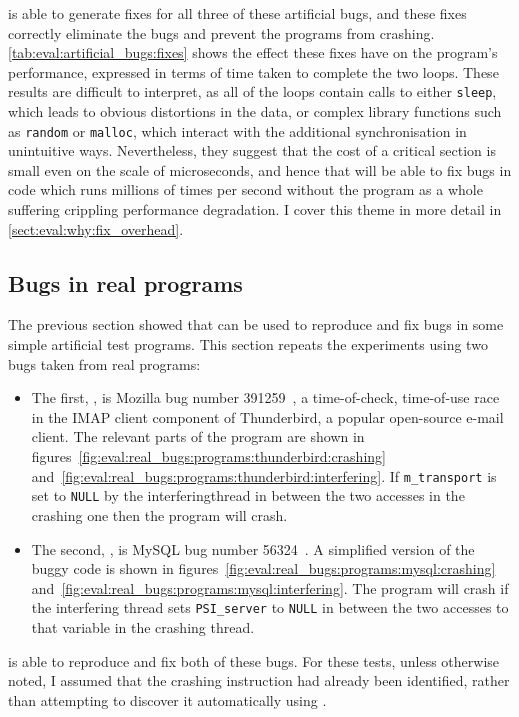 \noindent
{\Technique} is able to generate fixes for all three of these
artificial bugs, and these fixes correctly eliminate the bugs and
prevent the programs from crashing.
\autoref{tab:eval:artificial_bugs:fixes} shows the effect these fixes
have on the program's performance, expressed in terms of time taken to
complete the two loops.  These results are difficult to interpret, as
all of the loops contain calls to either \texttt{sleep}, which leads
to obvious distortions in the data, or complex library functions such
as \texttt{random} or \texttt{malloc}, which interact with the
additional synchronisation in unintuitive ways.  Nevertheless, they
suggest that the cost of a {\technique} critical section is small even
on the scale of microseconds, and hence that {\technique} will be able
to fix bugs in code which runs millions of times per second without
the program as a whole suffering crippling performance degradation.  I
cover this theme in more detail in
\autoref{sect:eval:why:fix_overhead}.

\subsection{Bugs in real programs}
\label{sect:eval:does:real}

The previous section showed that {\technique} can be used to reproduce
and fix bugs in some simple artificial test programs.  This section
repeats the experiments using two bugs taken from real programs:
\begin{itemize}
\item The first, , is Mozilla bug number
  391259~\cite{Mery2007}, a time-of-check, time-of-use race in the IMAP
  client component of Thunderbird, a popular open-source e-mail
  client.  The relevant parts of the program are shown in
  figures~\ref{fig:eval:real_bugs:programs:thunderbird:crashing}
  and~\ref{fig:eval:real_bugs:programs:thunderbird:interfering}.  If
  \verb|m_transport| is set to \verb|NULL| by the
  \gls{interferingthread} in between the two accesses in the crashing
  one then the program will crash.
\item The second, , is MySQL bug number
  56324~\cite{Correia2010}.  A simplified version of the buggy code is
  shown in figures~\ref{fig:eval:real_bugs:programs:mysql:crashing}
  and~\ref{fig:eval:real_bugs:programs:mysql:interfering}.  The
  program will crash if the interfering thread sets
  \texttt{PSI\_server} to \texttt{NULL} in between the two accesses to
  that variable in the crashing thread.
\end{itemize}
{\Technique} is able to reproduce and fix both of these bugs.  For
these tests, unless otherwise noted, I assumed that the crashing
instruction had already been identified, rather than attempting to
discover it automatically using {\technique}.


